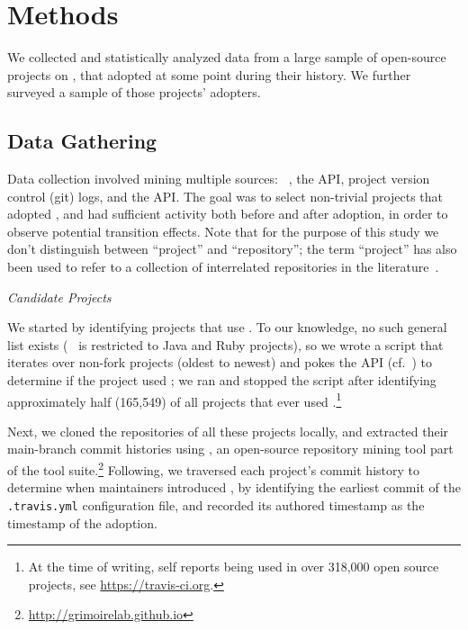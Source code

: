 
\section{Methods}
\label{sec:method}

We collected and statistically analyzed data from a large sample of open-source 
projects on \GH, that adopted \Tvis at some point during their history.
We further surveyed a sample of those projects' \Tvis adopters.

\subsection{Data Gathering}

Data collection involved mining multiple sources: \GHT~\cite{gousios2012ghtorrent}, 
the \GH API, project version control (git) logs, and the \Tvis API.
The goal was to select non-trivial projects that adopted \Tvis, and had sufficient
activity both before and after adoption, in order to observe potential transition effects.
Note that for the purpose of this study we don't distinguish between ``project'' 
and ``repository''; the term ``project'' has also been used to refer to a collection 
of interrelated repositories in the literature~\cite{vasilescu2016sky}.

\smallskip\noindent\emph{Candidate Projects} 

We started by identifying \GH projects that use \Tvis.
To our knowledge, no such general list exists 
(\TT~\cite{beller2017travistorrent} is restricted to Java and Ruby projects), so
we wrote a script that iterates over non-fork \GHT projects (oldest to newest)
and pokes the \Tvis API (cf.\ \cite{era14}) to determine if the project used \Tvi;
we ran and stopped the script after identifying approximately half (165,549)
of all \GH projects that ever used \Tvis.\footnote{At the time of writing, \Tvi self 
reports being used in over 318,000 open source \GH projects, see 
\url{https://travis-ci.org}.} 

Next, we cloned the \GH repositories of all these projects locally, and extracted
their main-branch commit histories using \Perc, an open-source repository
mining tool part of the \GLab tool suite.\footnote{\url{http://grimoirelab.github.io}}
Following, we traversed each project's commit history to determine when 
maintainers introduced \Tvis, by identifying the earliest commit of the 
\texttt{.travis.yml} configuration file, and recorded its authored timestamp as
the timestamp of the \Tvi adoption.

